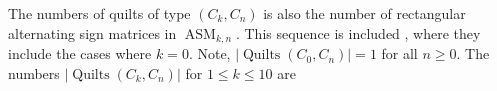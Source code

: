 \documentclass[12pt]{amsart}
\numberwithin{equation}{section}
\theoremstyle{definition}
\newcommand{\ASM}{\operatorname{ASM}}
\newcommand{\quilt}{\operatorname{Quilts}}
\begin{document}
The numbers of quilts of type $(C_k, C_n)$ is also the number of
rectangular alternating sign matrices in $\ASM_{k,n}$. This sequence
is included \cite[A297622]{oeis}, where they include the cases where
$k=0$.    Note, $|\quilt(C_0,
C_n)|=1$ for all $n\geq 0$.  The numbers $|\quilt(C_k, C_n)|$
for $1\leq k\leq 10$ are




\end{document}
